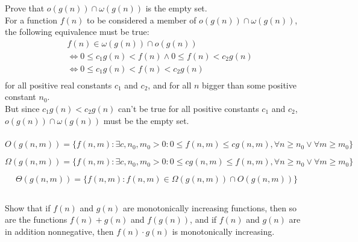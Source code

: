 \documentclass[11pt]{article}
\numberwithin{equation}{section}
\renewcommand{\iff}{\Leftrightarrow}
\begin{document}
\subsubsection{}
Prove that $o(g(n)) \cap \omega(g(n))$ is the empty set.\\

For a function $f(n)$ to be considered a member of $o(g(n)) \cap \omega(g(n))$,
the following equivalence must be true:
\begin{equation*}
    \begin{split}
        & f(n) \in \omega(g(n)) \cap o(g(n))\\
        & \iff 0 \leq c_1 g(n) < f(n) \land 0 \leq f(n) < c_2 g(n)\\
        & \iff 0 \leq c_1 g(n) < f(n) < c_2 g(n)\\
    \end{split}
\end{equation*}
for all positive real constants $c_1$ and $c_2$, and for all $n$ bigger than
some positive constant $n_0$.\\
But since $c_1 g(n) < c_2 g(n)$ can't be true for all positive constants
$c_1$ and $c_2$, $o(g(n)) \cap \omega(g(n))$ must be the empty set.

\pagebreak
\subsubsection{}
\[O(g(n,m)) = \{ f(n,m) : \exists c,n_0, m_0 > 0 :
    0 \leq f(n,m) \leq cg(n,m), \forall n \geq n_0 \lor \forall m \geq m_0 \} \] 

\[\Omega(g(n,m)) = \{ f(n,m) : \exists c,n_0, m_0 > 0 :
    0 \leq cg(n,m) \leq f(n,m), \forall n \geq n_0 \lor \forall m \geq m_0 \} \] 

\[\Theta(g(n,m)) = \{ f(n,m) : f(n,m) \in \Omega(g(n,m)) \cap O(g(n,m)) \} \] 

\subsection{}
\subsubsection{}
Show that if $f(n)$ and $g(n)$ are monotonically increasing functions, then so are
the functions $f(n) + g(n)$ and $f(g(n))$, and if $f(n)$ and $g(n)$ are in addition
nonnegative, then $f(n) \cdot g(n)$ is monotonically increasing.\\
\end{document}

